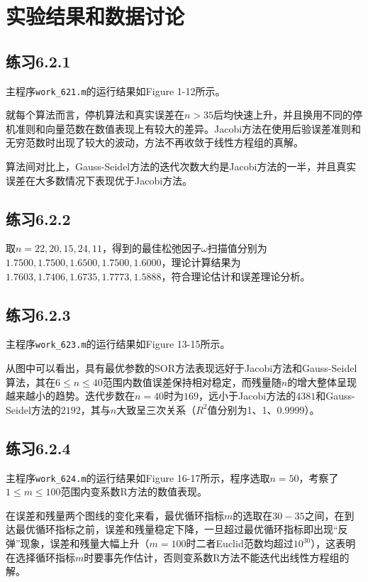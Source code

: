 \documentclass[UTF8,a4paper,10pt]{ctexart}
\begin{document}
\section{实验结果和数据讨论}
    \subsection{练习6.2.1}
        \par
        主程序\texttt{work\_621.m}的运行结果如Figure 1-12所示。
        \par
        就每个算法而言，停机算法和真实误差在$n>35$后均快速上升，并且换用不同的停机准则和向量范数在数值表现上有较大的差异。Jacobi方法在使用后验误差准则和无穷范数时出现了较大的波动，方法不再收敛于线性方程组的真解。
        \par
        算法间对比上，Gauss-Seidel方法的迭代次数大约是Jacobi方法的一半，并且真实误差在大多数情况下表现优于Jacobi方法。
    \subsection{练习6.2.2}
        取$n=22,20,15,24,11$，得到的最佳松弛因子$\omega$扫描值分别为$1.7500,1.7500,1.6500,1.7500,1.6000$，理论计算结果为$1.7603,1.7406,1.6735,1.7773,1.5888$，符合理论估计和误差理论分析。
    \subsection{练习6.2.3}
        \par
        主程序\texttt{work\_623.m}的运行结果如Figure 13-15所示。
        \par
        从图中可以看出，具有最优参数的SOR方法表现远好于Jacobi方法和Gauss-Seidel算法，其在$6\le n \le 40$范围内数值误差保持相对稳定，而残量随$n$的增大整体呈现越来越小的趋势。迭代步数在$n=40$时为$169$，远小于Jacobi方法的$4381$和Gauss-Seidel方法的$2192$，其与$n$大致呈三次关系（$R^2$值分别为1、1、0.9999）。
    \subsection{练习6.2.4}
        \par
        主程序\texttt{work\_624.m}的运行结果如Figure 16-17所示，程序选取$n=50$，考察了$1\le m \le 100$范围内变系数R方法的数值表现。
        \par
        在误差和残量两个图线的变化来看，最优循环指标$m$的选取在$30-35$之间，在到达最优循环指标之前，误差和残量稳定下降，一旦超过最优循环指标即出现“反弹”现象，误差和残量大幅上升（$m=100$时二者Euclid范数均超过$10^{30}$），这表明在选择循环指标$m$时要事先作估计，否则变系数R方法不能迭代出线性方程组的解。
\end{document}
